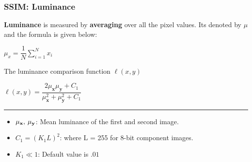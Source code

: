 \documentclass[13.5pt,aspecratio=169, xcolor=dvipsnames]{beamer}
\begin{document}
\begin{frame}
    \onehalfspacing
        \frametitle{SSIM: Luminance}
        
        \textbf{Luminance} is measured by \textbf{averaging} over all the pixel values. Its denoted by $\mu$ and the formula is given below:
        \smallskip
        {\Large
        \begin{center}
            $ \mu_x = \dfrac{1}{N} \sum_{i=1}^{N} x_i$
        \end{center}
        }

        \begin{block}{The luminance comparison function $\ell(x,y)$}
            {\Large
            \begin{center}
                $ \ell(x,y) = \dfrac{2\mu_{\textbf{x}} \mu_{\textbf{y}} + C_1}{\mu^2_{\textbf{x}} + \mu^2_{\textbf{y}} + C_1} $
            \end{center}
            }
            \hspace{8em}\rule{0.5\textwidth}{0.4pt}
            \begin{itemize}
                \item {\Large $\mu_{\textbf{x}}, \hspace{0.2em} \mu_{\textbf{y}}$}: Mean luminance of the first and second image.
                \item $C_1 = (K_1 L)^2$: where L = 255 for 8-bit component images.
                \item $K_1 \ll 1$: Default value is $.01$
            \end{itemize}
        \end{block}
        
        
      
\end{frame}
    
\end{document}
